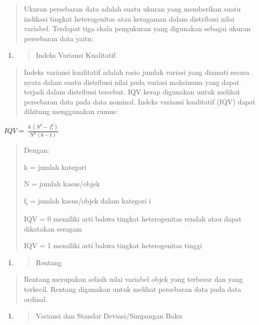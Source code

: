 \documentclass[
]{article}
\begin{document}
\begin{quote}
Ukuran persebaran data adalah suatu ukuran yang memberikan suatu
indikasi tingkat heterogenitas atau keragaman dalam distribusi nilai
variabel. Terdapat tiga skala pengukuran yang digunakan sebagai ukuran
persebaran data yaitu:
\end{quote}

\begin{enumerate}
\def\labelenumi{\arabic{enumi}.}
\item
  \begin{quote}
  Indeks Variansi Kualitatif
  \end{quote}
\end{enumerate}

\begin{quote}
Indeks variansi kualitatif adalah rasio jumlah variasi yang diamati
secara nyata dalam suatu distribusi nilai pada variasi maksimum yang
dapat terjadi dalam distribusi tersebut. IQV kerap digunakan untuk
melihat persebaran data pada data nominal. Indeks variansi kualitatif
(IQV) dapat dihitung menggunakan rumus:
\end{quote}

\(IQV = \ \frac{k\ (N^{2} - \ f_{i}^{2})}{N^{2\ }(k - 1)}\)

\begin{quote}
Dengan:

k = jumlah kategori

N = jumlah kasus/objek

f\textsubscript{i} = jumlah kasus/objek dalam kategori i

IQV = 0 memiliki arti bahwa tingkat heterogenitas rendah atau dapat
dikatakan seragam

IQV = 1 memiliki arti bahwa tingkat heterogenitas tinggi
\end{quote}

\begin{enumerate}
\def\labelenumi{\arabic{enumi}.}
\setcounter{enumi}{1}
\item
  \begin{quote}
  Rentang
  \end{quote}
\end{enumerate}

\begin{quote}
Rentang merupakan selisih nilai variabel objek yang terbesar dan yang
terkecil. Rentang digunakan untuk melihat persebaran data pada data
ordinal.
\end{quote}

\begin{enumerate}
\def\labelenumi{\arabic{enumi}.}
\setcounter{enumi}{2}
\item
  \begin{quote}
  Variansi dan Standar Deviasi/Simpangan Baku
  \end{quote}
\end{enumerate}
\end{document}
